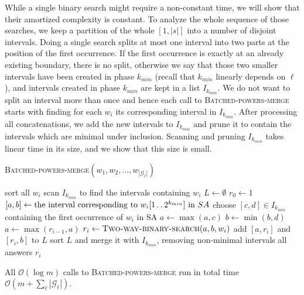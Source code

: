 \documentclass[runningheads]{llncs}
\newcommand{\twodots}{\mathinner{\ldotp\ldotp}}
\newcommand{\proc}[1]{\textnormal{\scshape#1}}
\begin{document}
While a single binary search might require a non-constant time, we will show that their amortized complexity is constant. To analyze the whole sequence of those searches, we keep a partition of the whole $[1,|s|]$ into a number of disjoint intervals. Doing a single search splits at most one interval into two parts at the position of the first occurrence. If the first occurrence is exactly at an already existing boundary, there is no split, otherwise we say that those two smaller intervals have been created in phase $k_{min}$ (recall that $k_{min}$ linearly depends on $\ell$), and intervals created in phase $k_{min}$ are kept in a list $I_{k_{min}}$. We do not want to split an interval more than once and hence each call to \proc{Batched-powers-merge} starts with finding for each $w_{i}$ its corresponding interval in $I_{k_{min}}$. After processing all concatenations, we add the new intervals to $I_{k_{min}}$ and prune it to contain the intervals which are minimal under inclusion. Scanning and pruning $I_{k_{min}}$ takes linear time in its size, and we show that this size is small.
\begin{algorithm}
\caption{\proc{Batched-powers-merge}$(w_1,w_2,\ldots,w_{\left|\mathcal{G}_\ell\right|})$}
\begin{algorithmic}[1]
\State sort all $w_i$ \label{line:sort input} 
\State scan $I_{k_{min}}$ to find the intervals containing $w_i$ \label{line:scan input}
\State $L \gets \emptyset$
\State $r_0 \gets 1$
  \State $[a,b] \gets \text{the interval corresponding to } w_i[1\twodots 2^{k_{min}}] \text{ in } SA$ 
  \State choose $[c,d]\in I_{k_{min}}$ containing the first occurrence of $w_i$ in SA \label{line:choose first}
    \State $a \gets \max(a,c)$
    \State $b \gets \min(b,d)$
  \EndIf
  \State $a \gets \max(r_{i-1}, a)$
  \State $r_i \gets \proc{Two-way-binary-search}(a,b,w_i)$ \label{line:two way search}
  \State add $[a,r_i]$ and $[r_i,b]$ to $L$
\EndFor
\State sort $L$ and merge it with $I_{k_{min}}$, removing non-minimal intervals \label{line:sorting list}
\State \Return all answers $r_i$
\end{algorithmic}
\end{algorithm}
\begin{lemma}\label{lemma:batched merges}
All $\mathcal{O}(\log m)$ calls to \proc{Batched-powers-merge} run in total time $\mathcal{O}(m+\sum_\ell\left|\mathcal{G}_\ell\right|)$.
\end{lemma}
\end{document}
